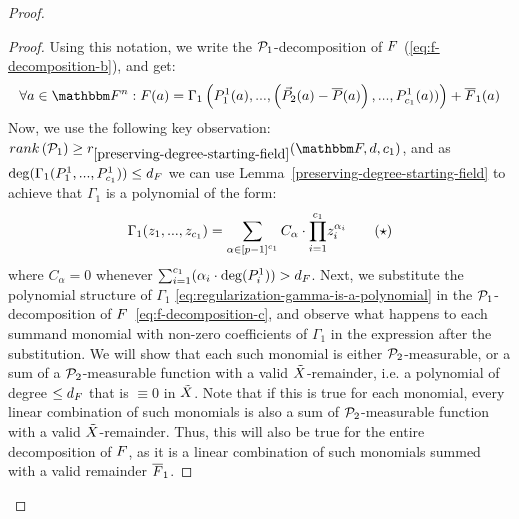 \begin{proof}
\begin{proof}
        Using this notation, we write the $\genpolyset_1$-decomposition of $\genfunc$ (\ref{eq:f-decomposition-b}), and get:
        \begin{equation} \label{eq:f-decomposition-c}
            \forall a \in \field: \genfunc(a) = \Gamma_1 \parens
            {\genpoly^{1}_{1}(a)
                ,...,
                \parens{
                    \vec{\genpoly}_2(a)
                    - \relativeremainder{\genpoly}(a)}
                ,...,
                \genpoly^{1}_{c_1}(a))}
            + \relativeremainder{\genfunc}_1(a)
        \end{equation}
        Now, we use the following key observation:
        $\rank{\genpolyset_1} \geq \rankfunc_{\ref{preserving-degree-starting-field}}(\basefield, \degree, c_1)$,
        and as $\deg(\Gamma_1(\genpoly_1^1,...,\genpoly^1_{c_1})) \leq \degree_{\genfunc}$
        we can use Lemma~\ref{preserving-degree-starting-field} to achieve that $\Gamma_1$ is a polynomial of the form:
        \begin{equation*} \label{eq:regularization-gamma-is-a-polynomial}
            \Gamma_1(z_1,...,z_{c_1})  =
            \sum_{\alpha \in \left[ p - 1 \right]^{c_1}}
            {C_{\alpha} \cdot {\prod_{i = 1}^{c_1}}{z_i^{\alpha_i}}}
        \tag{$\star$}
        \end{equation*}
        where $C_{\alpha} = 0$ whenever $\sum_{i = 1}^{c_1}(\alpha_i \cdot \deg(\genpoly_i^1)) > \degree_{\genfunc}$.
        \newline
        Next, we substitute the polynomial structure of $\Gamma_1$ \eqref{eq:regularization-gamma-is-a-polynomial}
        in the $\genpolyset_1$-decomposition of $\genfunc$~\eqref{eq:f-decomposition-c},
        and observe what happens to each summand monomial with non-zero coefficients of $\Gamma_1$ in the expression after the substitution.
        \newline
        We will show that each such monomial is either $\genpolyset_2$-measurable,
        or a sum of a $\genpolyset_2$-measurable function with a valid ${\tilde{X}}$-remainder, i.e. a polynomial of degree $\leq \degree_{\genfunc}$ that is $\equiv 0$ in ${\tilde{X}}$.
        Note that if this is true for each monomial,
        every linear combination of such monomials is also a sum of $\genpolyset_2$-measurable function with a valid ${\tilde{X}}$-remainder.
        Thus, this will also be true for the entire decomposition of $\genfunc$, as it is a linear combination of such monomials summed with a valid remainder $\relativeremainder{\genfunc}_1$.

\end{proof}
\end{proof}
